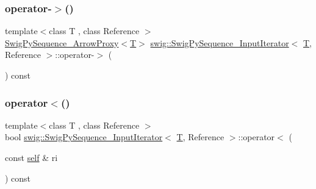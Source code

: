 \mbox{\label{structswig_1_1_swig_py_sequence___input_iterator_aad3ea724d8c2c25da1e8e67626e99766}} 
\subsubsection{\texorpdfstring{operator-\/$>$()}{operator->()}}
{\footnotesize\ttfamily template$<$class T , class Reference $>$ \\
\hyperlink{structswig_1_1_swig_py_sequence___arrow_proxy}{Swig\+Py\+Sequence\+\_\+\+Arrow\+Proxy}$<$\hyperlink{fmt_8h_a0acb682b8260ab1c60b918599864e2e5}{T}$>$ \hyperlink{structswig_1_1_swig_py_sequence___input_iterator}{swig\+::\+Swig\+Py\+Sequence\+\_\+\+Input\+Iterator}$<$ \hyperlink{fmt_8h_a0acb682b8260ab1c60b918599864e2e5}{T}, Reference $>$\+::operator-\/$>$ (\begin{DoxyParamCaption}{ }\end{DoxyParamCaption}) const\hspace{0.3cm}{\ttfamily [inline]}}

\mbox{\label{structswig_1_1_swig_py_sequence___input_iterator_aa86abc679e1f39a48692704314f4ce21}} 
\subsubsection{\texorpdfstring{operator$<$()}{operator<()}}
{\footnotesize\ttfamily template$<$class T , class Reference $>$ \\
bool \hyperlink{structswig_1_1_swig_py_sequence___input_iterator}{swig\+::\+Swig\+Py\+Sequence\+\_\+\+Input\+Iterator}$<$ \hyperlink{fmt_8h_a0acb682b8260ab1c60b918599864e2e5}{T}, Reference $>$\+::operator$<$ (\begin{DoxyParamCaption}\item[{const \hyperlink{structswig_1_1_swig_py_sequence___input_iterator_a3d3f028d1d9af412c61de2b5d8630321}{self} \&}]{ri }\end{DoxyParamCaption}) const\hspace{0.3cm}{\ttfamily [inline]}}

